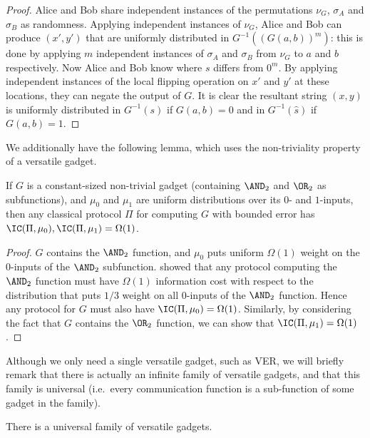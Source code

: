 \begin{proof}
Alice and Bob share independent instances of the permutations $\nu_G$, $\sigma_A$ and $\sigma_B$ as randomness. Applying independent instances of $\nu_G$, Alice and Bob can produce $(x',y')$ that are uniformly distributed in $G^{-1}((G(a,b))^m)$: this is done by applying $m$ independent instances of $\sigma_A$ and $\sigma_B$ from $\nu_G$ to $a$ and $b$ respectively. Now Alice and Bob know where $s$ differs from $0^m$. By applying independent instances of the local flipping operation on $x'$ and $y'$ at these locations, they can negate the output of $G$. It is clear the resultant string $(x,y)$ is uniformly distributed in $G^{-1}(s)$ if $G(a,b)=0$ and in $G^{-1}(\hat{s})$ if $G(a,b)=1$.
\end{proof}

We additionally have the following lemma, which
uses the non-triviality property of a versatile gadget.

\begin{lemma}\label{lem:ANDOR-classical}
If $G$ is a constant-sized non-trivial gadget (containing $\AND_2$ and $\OR_2$ as subfunctions), and $\mu_0$ and 
$\mu_1$ are uniform distributions over its $0$- and $1$-inputs, 
then any classical protocol $\Pi$ for computing $G$ with bounded 
error has $\IC(\Pi,\mu_0), \IC(\Pi,\mu_1) = \Omega(1)$.
\end{lemma}

\begin{proof}
$G$ contains the $\AND_2$ function, and $\mu_0$ puts uniform 
$\Omega(1)$ weight on the 0-inputs of the $\AND_2$ subfunction. 
\cite{BJKS04} showed that any protocol computing the $\AND_2$ 
function must have $\Omega(1)$ information cost with
respect to the distribution that puts
$1/3$ weight on all $0$-inputs of the $\AND_2$ function. Hence any 
protocol for $G$ must also have $\IC(\Pi,\mu_0)=\Omega(1)$. 
Similarly, by considering the fact that $G$ contains the $\OR_2$ 
function, we can show that $\IC(\Pi,\mu_1)=\Omega(1)$.
\end{proof}


Although we only need a single versatile gadget,
such as \textsc{VER}, we will briefly remark that there is
actually an infinite family of versatile gadgets, and that
this family is universal (i.e.\ every communication function
is a sub-function of some gadget in the family).

\begin{lemma}
There is a universal family of versatile gadgets.
\end{lemma}

